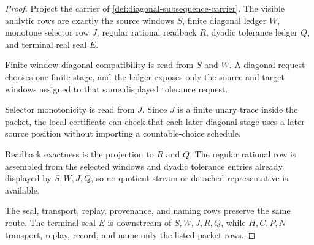 \begin{proof}
Project the carrier of \autoref{def:diagonal-subsequence-carrier}. The visible analytic rows are exactly the source windows $S$, finite diagonal ledger $W$, monotone selector row $J$, regular rational readback $R$, dyadic tolerance ledger $Q$, and terminal real seal $E$.

Finite-window diagonal compatibility is read from $S$ and $W$. A diagonal request chooses one finite stage, and the ledger exposes only the source and target windows assigned to that same displayed tolerance request.

Selector monotonicity is read from $J$. Since $J$ is a finite unary trace inside the packet, the local certificate can check that each later diagonal stage uses a later source position without importing a countable-choice schedule.

Readback exactness is the projection to $R$ and $Q$. The regular rational row is assembled from the selected windows and dyadic tolerance entries already displayed by $S,W,J,Q$, so no quotient stream or detached representative is available.

The seal, transport, replay, provenance, and naming rows preserve the same route. The terminal seal $E$ is downstream of $S,W,J,R,Q$, while $H,C,P,N$ transport, replay, record, and name only the listed packet rows.
\end{proof}

